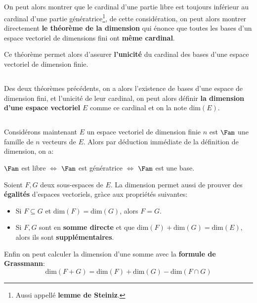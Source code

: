 \subsection*{}

On peut alors montrer que le cardinal d'une partie libre est toujours inférieur au cardinal d'une partie génératrice\footnote[1]{Aussi appellé \textbf{lemme de Steiniz}.}, de cette considération, on peut alors montrer directement \textbf{le théorème de la dimension} qui énonce que toutes les bases d'un espace vectoriel de dimensions fini ont \textbf{même cardinal}.\<

Ce théorème permet alors d'assurer \textbf{l'unicité} du cardinal des bases d'une espace vectoriel de dimension finie.
\subsection*{}

Des deux théorèmes précédents, on a alors l'existence de bases d'une espace de dimension fini, et l'unicité de leur cardinal, on peut alors définir \textbf{la dimension d'une espace vectoriel} \(E\) comme ce cardinal et on la note \(\text{dim}(E)\).

\subsection*{}

Considérons maintenant \(E\) un espace vectoriel de dimension finie \(n\) est \(\Fam\) une famille de \(n\) vecteurs de \(E\). Alors par déduction immédiate de la définition de dimension, on a:
\begin{center}
   \(\Fam\) est libre \(\Longleftrightarrow\) \(\Fam\) est génératrice \(\Longleftrightarrow\) \(\Fam\) est une base.
\end{center}
Soient \(F, G\) deux sous-espaces de \(E\). La dimension permet aussi de prouver des \textbf{égalités} d'espaces vectoriels, gràce aux propriétés suivantes:
\begin{itemize}
   \item Si \( F \subseteq G \) et \( \text{dim}(F) = \text{dim}(G) \), alors \( F = G \).
   \item Si \(F, G\) sont en \textbf{somme directe} et que \( \text{dim}(F) + \text{dim}(G) = \text{dim}(E) \), alors ils sont \textbf{supplémentaires}.
\end{itemize}
Enfin on peut calculer la dimension d'une somme avec la \textbf{formule de Grassmann}:
\[ 
   \text{dim}(F + G) = \text{dim}(F) + \text{dim}(G) - \text{dim}(F \cap G)
\]
